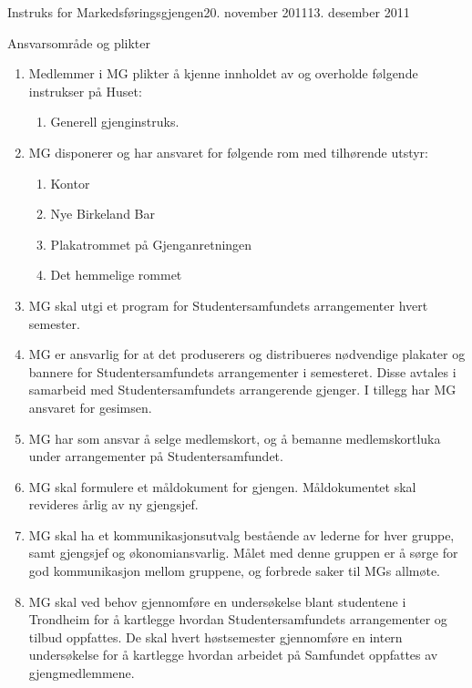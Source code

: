 \documentclass[../fsbok.tex]{subfiles}
\begin{document}
\begin{instruks}{Instruks for Markedsføringsgjengen}{20. november 2011}{13. desember 2011 }
    \begin{instruksledd}{Ansvarsområde og plikter}
        \begin{enumerate}   
            \item  Medlemmer i MG plikter å kjenne innholdet av og overholde følgende instrukser på
                Huset:
                \begin{enumerate}
                    \item Generell gjenginstruks.
                \end{enumerate}
            \item MG disponerer og har ansvaret for følgende rom med tilhørende utstyr:
                \begin{enumerate}
                    \item Kontor
                    \item Nye Birkeland Bar
                    \item Plakatrommet på Gjenganretningen
                    \item Det hemmelige rommet
                \end{enumerate}
            \item MG skal utgi et program for
                Studentersamfundets arrangementer hvert semester.
            \item MG er ansvarlig for at det
                produserers og distribueres nødvendige plakater og bannere for
                Studentersamfundets
                arrangementer i semesteret. Disse avtales i samarbeid med Studentersamfundets
                arrangerende
                gjenger. I tillegg har MG ansvaret for gesimsen.
            \item MG har som ansvar å selge medlemskort, og å
                bemanne medlemskortluka under arrangementer på Studentersamfundet.
            \item MG skal formulere et måldokument for
                gjengen. Måldokumentet skal revideres årlig av ny gjengsjef.
            \item MG skal ha et kommunikasjonsutvalg
                bestående av lederne for hver gruppe, samt gjengsjef og
                økonomiansvarlig. Målet med denne gruppen er å sørge for god kommunikasjon mellom gruppene, og
                forbrede saker til MGs allmøte.
            \item MG skal ved behov gjennomføre en
                undersøkelse blant studentene i Trondheim for å kartlegge
                hvordan Studentersamfundets arrangementer og tilbud oppfattes. De skal hvert høstsemester
                gjennomføre en
                intern undersøkelse for å kartlegge hvordan arbeidet på Samfundet oppfattes av gjengmedlemmene.
        \end{enumerate}
    \end{instruksledd}


\end{instruks}
\end{document}
